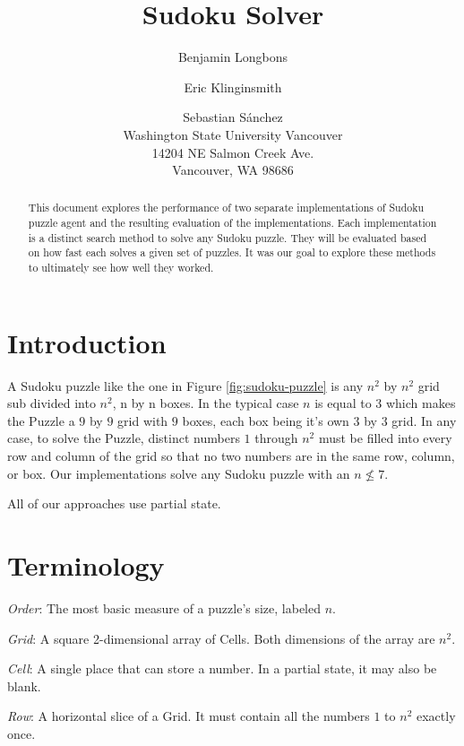 \documentclass[letterpaper]{article}
\begin{document}
\title{Sudoku Solver}
\author{
	Benjamin Longbons\and
    Eric Klinginsmith \and
    Sebastian S\'{a}nchez \\
Washington State University Vancouver \\
14204 NE Salmon Creek Ave. \\
Vancouver, WA 98686
}

\maketitle
\begin{abstract}
This document explores the performance of two separate implementations of Sudoku puzzle agent and the resulting evaluation of the implementations. Each implementation is a distinct search method to solve any Sudoku puzzle. They will be evaluated based on how fast each solves a given set of puzzles. It was our goal to explore these methods to ultimately see how well they worked.
\end{abstract}

\section{Introduction}

A Sudoku puzzle like the one in Figure \ref{fig:sudoku-puzzle} is any $ n^{2} $ by $ n^{2} $ grid sub divided into $ n^{2} $, n by n boxes. In the typical case $ n $ is equal to $3$ which makes the Puzzle a $9$ by $9$ grid with $9$ boxes, each box being it's own $3$ by $3$ grid. In any case, to solve the Puzzle, distinct numbers $1$ through $ n^{2} $ must be filled into every row and column of the grid so that no two numbers are in the same row, column, or box. Our implementations solve any Sudoku puzzle with an $n \not\le 7$.

All of our approaches use partial state.

\section{Terminology}

\emph{Order}: The most basic measure of a puzzle's size, labeled $ n $.

\emph{Grid}: A square 2-dimensional array of Cells. Both dimensions
of the array are $ n^2 $.

\emph{Cell}: A single place that can store a number. In a partial state,
it may also be blank.

\emph{Row}: A horizontal slice of a Grid. It must contain all the
numbers $ 1 $ to $ n^2 $ exactly once.
\end{document}
